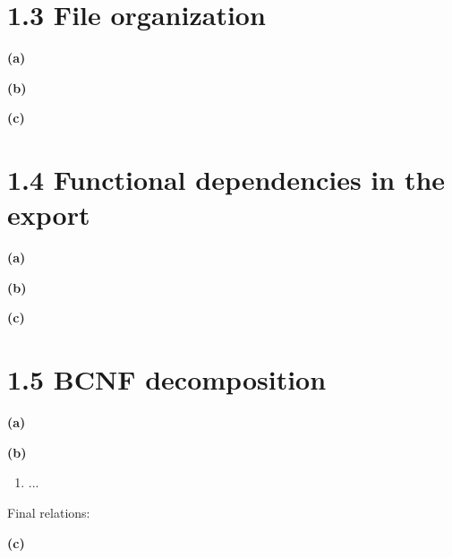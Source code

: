 \section*{1.3 File organization}

\textbf{(a)}

\textbf{(b)}

\textbf{(c)}

\section*{1.4 Functional dependencies in the export}

\textbf{(a)}

\textbf{(b)}

\textbf{(c)}

\section*{1.5 BCNF decomposition}

\textbf{(a)}

\textbf{(b)}

\begin{enumerate}
  \item ...
\end{enumerate}

Final relations:

\textbf{(c)}


